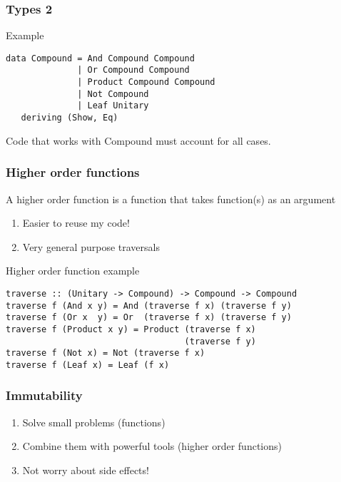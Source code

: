 \documentclass[compress]{beamer}
\begin{document}
\begin{frame}[fragile]
\frametitle{Types 2}
\begin{block}{Example}
\begin{lstlisting}
data Compound = And Compound Compound
              | Or Compound Compound
              | Product Compound Compound
              | Not Compound
              | Leaf Unitary
   deriving (Show, Eq)
\end{lstlisting}
\end{block}

Code that works with Compound must account for all cases.
\end{frame}


\begin{frame}
\frametitle{Higher order functions}

A higher order function is a function that takes function(s)
as an argument

\begin{enumerate}
\item Easier to reuse my code!
\item Very general purpose traversals
\end{enumerate}

\end{frame}

\begin{frame}[fragile]

\begin{block}{Higher order function example}
\begin{lstlisting}
traverse :: (Unitary -> Compound) -> Compound -> Compound
traverse f (And x y) = And (traverse f x) (traverse f y)
traverse f (Or x  y) = Or  (traverse f x) (traverse f y)
traverse f (Product x y) = Product (traverse f x)
                                   (traverse f y)
traverse f (Not x) = Not (traverse f x)
traverse f (Leaf x) = Leaf (f x)
\end{lstlisting}
\end{block}
\end{frame}

\begin{frame}
\frametitle{Immutability}
\begin{enumerate}
\item Solve small problems (functions)
\item Combine them with powerful tools (higher order functions)
\item Not worry about side effects!
\end{enumerate}

\end{frame}
\end{document}
